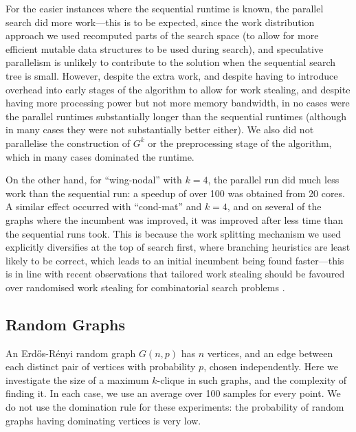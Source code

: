 \documentclass[letterpaper]{article}
\begin{document}
For the easier instances where the sequential runtime is known, the parallel search did more
work---this is to be expected, since the work distribution approach we used recomputed parts of the
search space (to allow for more efficient mutable data structures to be used during search), and
speculative parallelism is unlikely to contribute to the solution when the sequential search tree is
small. However, despite the extra work, and despite having to introduce overhead into early stages
of the algorithm to allow for work stealing, and despite having more processing power but not more
memory bandwidth, in no cases were the parallel runtimes substantially longer than the sequential
runtimes (although in many cases they were not substantially better either). We also did not
parallelise the construction of $G^k$ or the preprocessing stage of the algorithm, which in many
cases dominated the runtime.

On the other hand, for ``wing-nodal'' with $k=4$, the parallel run did much less work than the
sequential run: a speedup of over 100 was obtained from 20 cores. A similar effect occurred with
``cond-mat'' and $k=4$, and on several of the graphs where the incumbent was improved, it was
improved after less time than the sequential runs took. This is because the work splitting mechanism
we used explicitly diversifies at the top of search first, where branching heuristics are least
likely to be correct, which leads to an initial incumbent being found faster---this is in line with
recent observations that tailored work stealing should be favoured over randomised work stealing for
combinatorial search problems \cite{DBLP:conf/cp/ChuSS09,DBLP:journals/topc/McCreeshP15}.

\subsection{Random Graphs}

An Erd\H{o}s-R\'{e}nyi random graph $G(n, p)$ has $n$ vertices, and an edge between each distinct
pair of vertices with probability $p$, chosen independently. Here we investigate the size of a
maximum $k$-clique in such graphs, and the complexity of finding it. In each case, we use an average
over 100 samples for every point.  We do not use the domination rule for these experiments: the
probability of random graphs having dominating vertices is very low.
\end{document}
